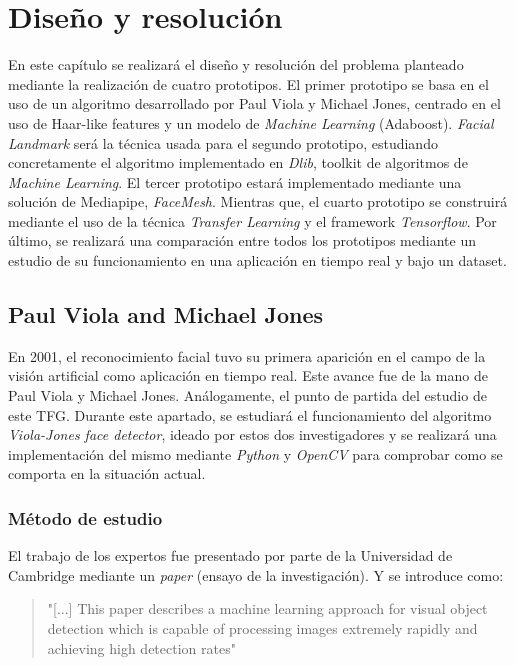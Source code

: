 
\chapter{Diseño y resolución}
\vspace{-1cm}

En este capítulo se realizará el diseño y resolución del problema planteado mediante la realización de cuatro prototipos. El primer prototipo se basa en el uso de un algoritmo desarrollado por Paul Viola y Michael Jones, centrado en el uso de Haar-like features y un modelo de \textit{Machine Learning} (Adaboost). \textit{Facial Landmark} será la técnica usada para el segundo prototipo, estudiando concretamente el algoritmo implementado en \textit{Dlib}, toolkit de algoritmos de \textit{Machine Learning}. El tercer prototipo estará implementado mediante una solución de Mediapipe, \textit{FaceMesh}. Mientras que, el cuarto prototipo se construirá mediante el uso de la técnica \textit{Transfer Learning} y el framework \textit{Tensorflow}. Por último, se realizará una comparación entre todos los prototipos mediante un estudio de su funcionamiento en una aplicación en tiempo real y bajo un dataset.

\vspace{-1cm}
\section{Paul Viola and Michael Jones} \label{haar-like}
\vspace{-0.7cm}

En 2001, el reconocimiento facial tuvo su primera aparición en el campo de la visión artificial como aplicación en tiempo real. Este avance fue de la mano de Paul Viola y Michael Jones. Análogamente, el punto de partida del estudio de este TFG. Durante este apartado, se estudiará el funcionamiento del algoritmo \textit{Viola-Jones face detector}, ideado por estos dos investigadores y se realizará una implementación del mismo mediante \textit{Python} y \textit{OpenCV} para comprobar como se comporta en la situación actual.

\subsection*{Método de estudio}
\vspace{-0.7cm}
El trabajo de los expertos fue presentado por parte de la Universidad de Cambridge mediante un \textit{paper} (ensayo de la investigación). Y se introduce como: 
\begin{quote}
	"[...] This paper describes a machine learning approach for visual object detection which is capable of processing images extremely rapidly and achieving high detection rates" \cite{paulViola}
\end{quote}

